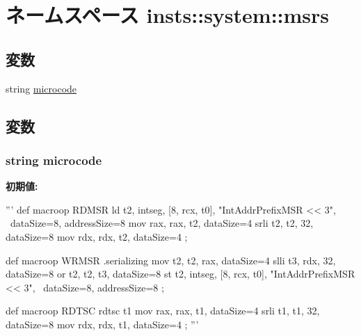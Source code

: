 \hypertarget{namespaceinsts_1_1system_1_1msrs}{
\section{ネームスペース insts::system::msrs}
\label{namespaceinsts_1_1system_1_1msrs}
}
\subsection*{変数}
\begin{DoxyCompactItemize}
\item 
string \hyperlink{namespaceinsts_1_1system_1_1msrs_a770f11a173e99389a8802f0107ed8f52}{microcode}
\end{DoxyCompactItemize}


\subsection{変数}
\hypertarget{namespaceinsts_1_1system_1_1msrs_a770f11a173e99389a8802f0107ed8f52}{
\subsubsection[{microcode}]{\setlength{\rightskip}{0pt plus 5cm}string {\bf microcode}}}
\label{namespaceinsts_1_1system_1_1msrs_a770f11a173e99389a8802f0107ed8f52}
{\bfseries 初期値:}
\begin{DoxyCode}
'''
def macroop RDMSR
{
    ld t2, intseg, [8, rcx, t0], "IntAddrPrefixMSR << 3", \
        dataSize=8, addressSize=8
    mov rax, rax, t2, dataSize=4
    srli t2, t2, 32, dataSize=8
    mov rdx, rdx, t2, dataSize=4
};

def macroop WRMSR
{
    .serializing
    mov t2, t2, rax, dataSize=4
    slli t3, rdx, 32, dataSize=8
    or t2, t2, t3, dataSize=8
    st t2, intseg, [8, rcx, t0], "IntAddrPrefixMSR << 3", \
        dataSize=8, addressSize=8
};

def macroop RDTSC
{
    rdtsc t1
    mov rax, rax, t1, dataSize=4
    srli t1, t1, 32, dataSize=8
    mov rdx, rdx, t1, dataSize=4
};
'''
\end{DoxyCode}
